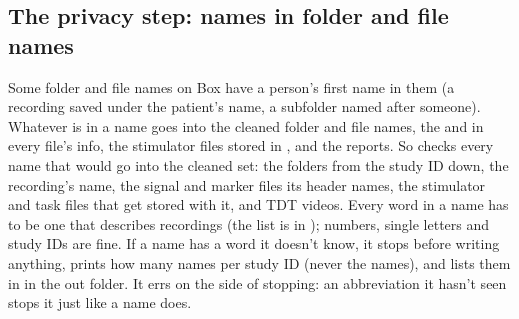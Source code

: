 \subsection{The privacy step: names in folder and file names}
Some folder and file names on Box have a person's first name in them (a recording saved under the patient's name, a subfolder named after someone). Whatever is in a name goes into the cleaned folder and file names, the  and  in every file's info, the stimulator files stored in , and the reports. So  checks every name that would go into the cleaned set: the folders from the study ID down, the recording's name, the signal and marker files its header names, the stimulator and task files that get stored with it, and TDT videos. Every word in a name has to be one that describes recordings (the list is  in ); numbers, single letters and study IDs are fine. If a name has a word it doesn't know, it stops before writing anything, prints how many names per study ID (never the names), and lists them in  in the out folder. It errs on the side of stopping: an abbreviation it hasn't seen stops it just like a name does.

